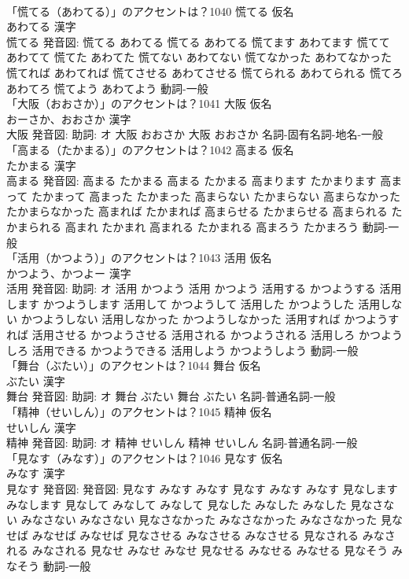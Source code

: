 \documentclass[8pt]{extreport}
\begin{document}
\begin{CJK}{UTF8}{min}
\\	「慌てる（あわてる）」のアクセントは？1040	慌てる 仮名　
\\	あわてる 漢字　
\\	慌てる 発音図:	慌てる あわてる		慌てる あわてる 慌てます あわてます 慌てて あわてて 慌てた あわてた 慌てない あわてない 慌てなかった あわてなかった 慌てれば あわてれば 慌てさせる あわてさせる 慌てられる あわてられる 慌てろ あわてろ 慌てよう あわてよう				動詞-一般 
\\	「大阪（おおさか）」のアクセントは？1041	大阪 仮名　
\\	おーさか、おおさか 漢字　
\\	大阪 発音図: 助詞: オ	大阪 おおさか		大阪 おおさか				名詞-固有名詞-地名-一般 
\\	「高まる（たかまる）」のアクセントは？1042	高まる 仮名　
\\	たかまる 漢字　
\\	高まる 発音図:	高まる たかまる		高まる たかまる 高まります たかまります 高まって たかまって 高まった たかまった 高まらない たかまらない 高まらなかった たかまらなかった 高まれば たかまれば 高まらせる たかまらせる 高まられる たかまられる 高まれ たかまれ 高まれる たかまれる 高まろう たかまろう				動詞-一般 
\\	「活用（かつよう）」のアクセントは？1043	活用 仮名　
\\	かつよう、かつよー 漢字　
\\	活用 発音図: 助詞: オ	活用 かつよう		活用 かつよう 活用する かつようする 活用します かつようします 活用して かつようして 活用した かつようした 活用しない かつようしない 活用しなかった かつようしなかった 活用すれば かつようすれば 活用させる かつようさせる 活用される かつようされる 活用しろ かつようしろ 活用できる かつようできる 活用しよう かつようしよう				動詞-一般 
\\	「舞台（ぶたい）」のアクセントは？1044	舞台 仮名　
\\	ぶたい 漢字　
\\	舞台 発音図: 助詞: オ	舞台 ぶたい		舞台 ぶたい				名詞-普通名詞-一般 
\\	「精神（せいしん）」のアクセントは？1045	精神 仮名　
\\	せいしん 漢字　
\\	精神 発音図: 助詞: オ	精神 せいしん		精神 せいしん				名詞-普通名詞-一般 
\\	「見なす（みなす）」のアクセントは？1046	見なす 仮名　
\\	みなす 漢字　
\\	見なす 発音図: 発音図:	見なす みなす みなす		見なす みなす みなす 見なします みなします 見なして みなして みなして 見なした みなした みなした 見なさない みなさない みなさない 見なさなかった みなさなかった みなさなかった 見なせば みなせば みなせば 見なさせる みなさせる みなさせる 見なされる みなされる みなされる 見なせ みなせ みなせ 見なせる みなせる みなせる 見なそう みなそう				動詞-一般 

\end{CJK}
\end{document}
